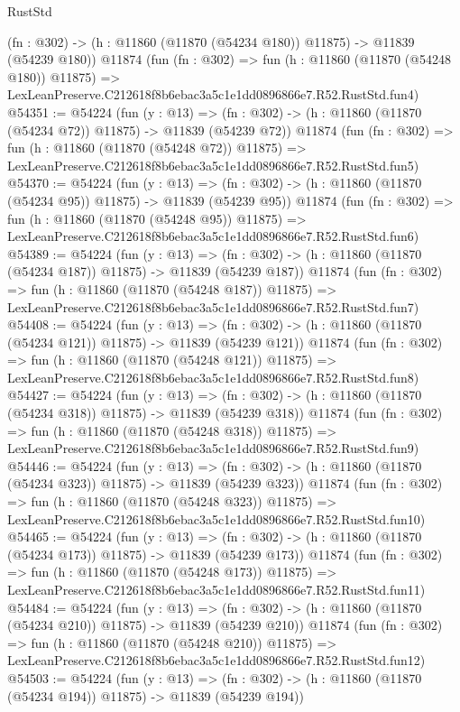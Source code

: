 \begin{lexlean}{RustStd}
\begin{coremodule}
    (fn : @302) -> (h : @11860 (@11870 (@54234 @180)) @11875) -> @11839 (@54239 @180))
    @11874
    (fun (fn : @302) =>
    fun (h : @11860 (@11870 (@54248 @180)) @11875) =>
    LexLeanPreserve.C212618f8b6ebac3a5c1e1dd0896866e7.R52.RustStd.fun4)
@54351 := @54224
    (fun (y : @13) =>
    (fn : @302) -> (h : @11860 (@11870 (@54234 @72)) @11875) -> @11839 (@54239 @72))
    @11874
    (fun (fn : @302) =>
    fun (h : @11860 (@11870 (@54248 @72)) @11875) =>
    LexLeanPreserve.C212618f8b6ebac3a5c1e1dd0896866e7.R52.RustStd.fun5)
@54370 := @54224
    (fun (y : @13) =>
    (fn : @302) -> (h : @11860 (@11870 (@54234 @95)) @11875) -> @11839 (@54239 @95))
    @11874
    (fun (fn : @302) =>
    fun (h : @11860 (@11870 (@54248 @95)) @11875) =>
    LexLeanPreserve.C212618f8b6ebac3a5c1e1dd0896866e7.R52.RustStd.fun6)
@54389 := @54224
    (fun (y : @13) =>
    (fn : @302) -> (h : @11860 (@11870 (@54234 @187)) @11875) -> @11839 (@54239 @187))
    @11874
    (fun (fn : @302) =>
    fun (h : @11860 (@11870 (@54248 @187)) @11875) =>
    LexLeanPreserve.C212618f8b6ebac3a5c1e1dd0896866e7.R52.RustStd.fun7)
@54408 := @54224
    (fun (y : @13) =>
    (fn : @302) -> (h : @11860 (@11870 (@54234 @121)) @11875) -> @11839 (@54239 @121))
    @11874
    (fun (fn : @302) =>
    fun (h : @11860 (@11870 (@54248 @121)) @11875) =>
    LexLeanPreserve.C212618f8b6ebac3a5c1e1dd0896866e7.R52.RustStd.fun8)
@54427 := @54224
    (fun (y : @13) =>
    (fn : @302) -> (h : @11860 (@11870 (@54234 @318)) @11875) -> @11839 (@54239 @318))
    @11874
    (fun (fn : @302) =>
    fun (h : @11860 (@11870 (@54248 @318)) @11875) =>
    LexLeanPreserve.C212618f8b6ebac3a5c1e1dd0896866e7.R52.RustStd.fun9)
@54446 := @54224
    (fun (y : @13) =>
    (fn : @302) -> (h : @11860 (@11870 (@54234 @323)) @11875) -> @11839 (@54239 @323))
    @11874
    (fun (fn : @302) =>
    fun (h : @11860 (@11870 (@54248 @323)) @11875) =>
    LexLeanPreserve.C212618f8b6ebac3a5c1e1dd0896866e7.R52.RustStd.fun10)
@54465 := @54224
    (fun (y : @13) =>
    (fn : @302) -> (h : @11860 (@11870 (@54234 @173)) @11875) -> @11839 (@54239 @173))
    @11874
    (fun (fn : @302) =>
    fun (h : @11860 (@11870 (@54248 @173)) @11875) =>
    LexLeanPreserve.C212618f8b6ebac3a5c1e1dd0896866e7.R52.RustStd.fun11)
@54484 := @54224
    (fun (y : @13) =>
    (fn : @302) -> (h : @11860 (@11870 (@54234 @210)) @11875) -> @11839 (@54239 @210))
    @11874
    (fun (fn : @302) =>
    fun (h : @11860 (@11870 (@54248 @210)) @11875) =>
    LexLeanPreserve.C212618f8b6ebac3a5c1e1dd0896866e7.R52.RustStd.fun12)
@54503 := @54224
    (fun (y : @13) =>
    (fn : @302) -> (h : @11860 (@11870 (@54234 @194)) @11875) -> @11839 (@54239 @194))

\end{coremodule}
\end{lexlean}
